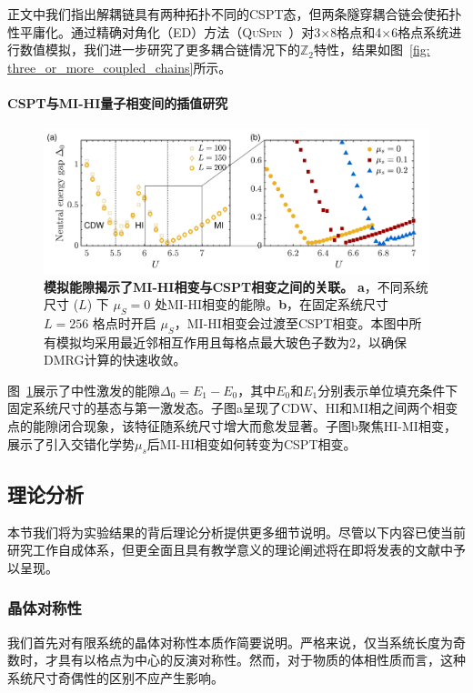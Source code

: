 \documentclass[preprint,superscriptaddress,floatfix, nofootinbib]{revtex4-2}
\begin{document}
正文中我们指出解耦链具有两种拓扑不同的CSPT态，但两条隧穿耦合链会使拓扑性平庸化。通过精确对角化（ED）方法（\textsc{QuSpin}~\cite{QuSpin}）对3×8格点和4×6格点系统进行数值模拟，我们进一步研究了更多耦合链情况下的$\mathbb{Z}_2$特性，结果如图~\ref{fig: three_or_more_coupled_chains}所示。

\paragraph*{CSPT与MI-HI量子相变间的插值研究}

\begin{figure}
    \centering
    \includegraphics[width=\textwidth]{figures/HI_to_CSPT_transition_large_size.pdf}
    \caption{\textbf{模拟能隙揭示了MI-HI相变与CSPT相变之间的关联。} \textbf{a}，不同系统尺寸 ($L$) 下 $\mu_S=0$ 处MI-HI相变的能隙。\textbf{b}，在固定系统尺寸 $L=256$ 格点时开启 $\mu_S$，MI-HI相变会过渡至CSPT相变。本图中所有模拟均采用最近邻相互作用且每格点最大玻色子数为2，以确保DMRG计算的快速收敛。
    }
    \label{fig: HI_to_CSPT_transition_large_size}
\end{figure}

图~\ref{fig: HI_to_CSPT_transition_large_size}展示了中性激发的能隙$\Delta_0=E_1-E_0$，其中$E_0$和$E_1$分别表示单位填充条件下固定系统尺寸的基态与第一激发态。子图a呈现了CDW、HI和MI相之间两个相变点的能隙闭合现象，该特征随系统尺寸增大而愈发显著。子图b聚焦HI-MI相变，展示了引入交错化学势$\mu_s$后MI-HI相变如何转变为CSPT相变。
\subsection*{理论分析}

本节我们将为实验结果的背后理论分析提供更多细节说明。尽管以下内容已使当前研究工作自成体系，但更全面且具有教学意义的理论阐述将在即将发表的文献\cite{Sahay2025}中予以呈现。
\subsubsection*{晶体对称性}
我们首先对有限系统的晶体对称性本质作简要说明。严格来说，仅当系统长度为奇数时，才具有以格点为中心的反演对称性。然而，对于物质的体相性质而言，这种系统尺寸奇偶性的区别不应产生影响。
\end{document}
